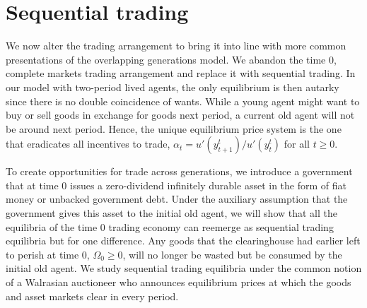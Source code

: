 




\section{Sequential trading}
  We now alter the trading arrangement to bring it
into line with more common presentations of the overlapping
generations model.   We abandon the time $0$, complete markets
 trading  arrangement and replace it with sequential
trading. In our model with two-period lived agents, the 
only equilibrium is then autarky since there is no double
coincidence of wants. While a young agent might want to
buy or sell goods in exchange for 
goods next period, a current old agent will not be
around next period.
Hence, the unique equilibrium price system is the one
that eradicates all incentives to trade,
$\alpha_t= u'(y^t_{t+1})/u'(y^t_t)$ for all $t\geq 0$.

To create opportunities for trade across
generations, we introduce a government
that at time $0$ issues a zero-dividend infinitely
durable asset in the form of fiat money or unbacked
government debt. Under the auxiliary assumption 
that the government gives this asset 
to the initial old agent, we will show that all the 
equilibria of the time $0$ trading economy
can reemerge as sequential trading equilibria but
for one difference. Any goods that the clearinghouse 
had earlier left to perish at time $0$, 
$\Omega_0\geq 0$, will no longer be wasted but be
consumed by the initial old agent.
We study sequential trading
equilibria under the common
notion of a Walrasian auctioneer who announces
equilibrium prices at which the goods and asset
markets clear in every period.

